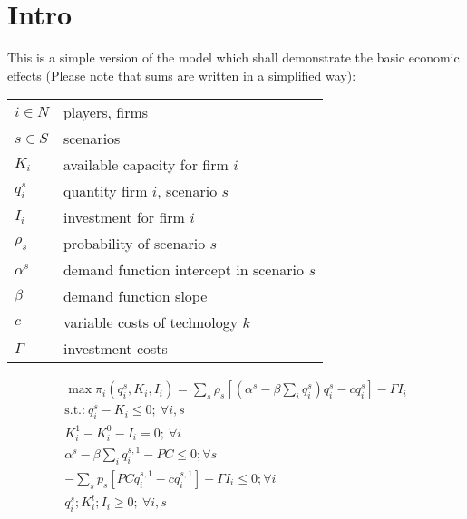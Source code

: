 \documentclass[a4paper,12pt]{article}
\theoremstyle{remark}
\begin{document}
  \section{Intro}

This is a simple version of the model which shall demonstrate the basic economic effects (Please note that sums are written in a simplified way):

\begin{tabular}[c]{l l}
$i\in N$        & players, firms\\
$s\in S$       	& scenarios\\
$K_{i}$      & available capacity for firm $i$ \\
$q_{i}^{s}$ & quantity firm $i$, scenario $s$ \\			
$I_{i}$   & investment for firm $i$\\
$\rho_s$        & probability of scenario $s$\\
$\alpha^s$  & demand function intercept in scenario $s$ \\
$\beta$   & demand function slope \\
$c$	     & variable costs of technology $k$	\\
$\Gamma$   & investment costs
\end{tabular}

\begin{gather}
	\max \pi_i(q_{i}^{s},K_{i},I_{i})=
	\sum_s \rho_s \left[ (\alpha^s- \beta \sum_i q_{i}^{s}) q_{i}^{s} - c q_{i}^{s}  \right] - \Gamma I_{i}  \\       
			\text{s.t.:} \  q_{i}^{s} - K_{i} \leq 0; \ \forall i,s  \label{eq:oligopmax2}\\ 
										  K^{1}_{i}  - K^{0}_{i}  - I_{i} = 0 ; \ \forall i  \label{eq:ologopmax5} \\  
										  \alpha^s - \beta \sum_i q_i^{s,1} - PC \leq 0; \forall s \\ \nonumber 
										  -\sum_s p_s \left[ PC q_{i}^{s,1} - c q_{i}^{s,1} \right] + \Gamma I_{i} \leq 0; \forall i \\ \nonumber 
 										  q_{i}^{s};K^t_{i};I_{i}	\geq 0; \ \forall i,s  \nonumber
\end{gather}
\end{document}
